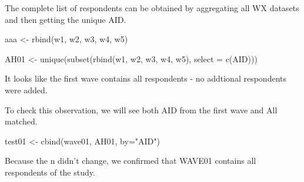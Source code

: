 \documentclass[
]{book}
\newenvironment{Shaded}{\begin{snugshade}}{\end{snugshade}}
\newcommand{\AttributeTok}[1]{\textcolor[rgb]{0.77,0.63,0.00}{#1}}
\newcommand{\DecValTok}[1]{\textcolor[rgb]{0.00,0.00,0.81}{#1}}
\newcommand{\FloatTok}[1]{\textcolor[rgb]{0.00,0.00,0.81}{#1}}
\newcommand{\FunctionTok}[1]{\textcolor[rgb]{0.00,0.00,0.00}{#1}}
\newcommand{\NormalTok}[1]{#1}
\newcommand{\OtherTok}[1]{\textcolor[rgb]{0.56,0.35,0.01}{#1}}
\newcommand{\SpecialCharTok}[1]{\textcolor[rgb]{0.00,0.00,0.00}{#1}}
\newcommand{\StringTok}[1]{\textcolor[rgb]{0.31,0.60,0.02}{#1}}
\begin{document}
\begin{Shaded}
\end{Shaded}

The complete list of respondents can be obtained by aggregating all WX datasets and then getting the unique AID.

\begin{Shaded}
\begin{Highlighting}[]
\NormalTok{aaa }\OtherTok{\textless{}{-}} \FunctionTok{rbind}\NormalTok{(w1, w2, w3, w4, w5)}
\end{Highlighting}
\end{Shaded}

\begin{Shaded}
\begin{Highlighting}[]
\NormalTok{AH01 }\OtherTok{\textless{}{-}} \FunctionTok{unique}\NormalTok{(}\FunctionTok{subset}\NormalTok{(}\FunctionTok{rbind}\NormalTok{(w1, w2, w3, w4, w5), }\AttributeTok{select =} \FunctionTok{c}\NormalTok{(AID)))}
\end{Highlighting}
\end{Shaded}

It looks like the first wave contains all respondents - no addtional respondents were added.

To check this observation, we will see both AID from the first wave and All matched.

\begin{Shaded}
\begin{Highlighting}[]
\NormalTok{test01 }\OtherTok{\textless{}{-}} \FunctionTok{cbind}\NormalTok{(wave01, AH01, }\AttributeTok{by=}\StringTok{"AID"}\NormalTok{)}
\end{Highlighting}
\end{Shaded}

Because the n didn't change, we confirmed that WAVE01 contains all respondents of the study.
\end{document}
